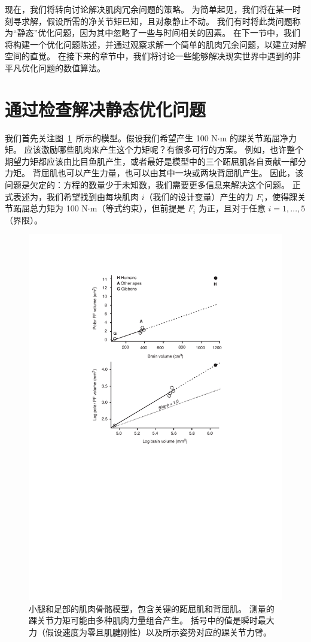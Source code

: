 现在，我们将转向讨论解决肌肉冗余问题的策略。
为简单起见，我们将在某一时刻寻求解，假设所需的净关节矩已知，且对象静止不动。
我们有时将此类问题称为“静态”优化问题，因为其中忽略了一些与时间相关的因素。
在下一节中，我们将构建一个优化问题陈述，并通过观察求解一个简单的肌肉冗余问题，以建立对解空间的直觉。
在接下来的章节中，我们将讨论一些能够解决现实世界中遇到的非平凡优化问题的数值算法。



\section{通过检查解决静态优化问题}

我们首先关注图~\ref{fig:9_2}~所示的模型。假设我们希望产生 100 N$ \cdot $m 的踝关节跖屈净力矩。
应该激励哪些肌肉来产生这个力矩呢？有很多可行的方案。
例如，也许整个期望力矩都应该由比目鱼肌产生，或者最好是模型中的三个跖屈肌各自贡献一部分力矩。
背屈肌也可以产生力量，也可以由其中一块或两块背屈肌产生。
因此，该问题是欠定的：方程的数量少于未知数，我们需要更多信息来解决这个问题。
正式表述为，我们希望找到由每块肌肉 $ i $（我们的设计变量）产生的力 $ F_i $，使得踝关节跖屈总力矩为 100 N$ \cdot $m（等式约束），但前提是 $ F_i $ 为正，且对于任意 $ i = 1, ..., 5 $（界限）。


\begin{figure}[!htb]
	\centering
	\includegraphics[width=0.75\linewidth]{chap9/9_2}
	\caption{小腿和足部的肌肉骨骼模型，包含关键的跖屈肌和背屈肌。
		测量的踝关节力矩可能由多种肌肉力量组合产生。
		括号中的值是瞬时最大力（假设速度为零且肌腱刚性）以及所示姿势对应的踝关节力臂。 \label{fig:9_2}}
\end{figure}


